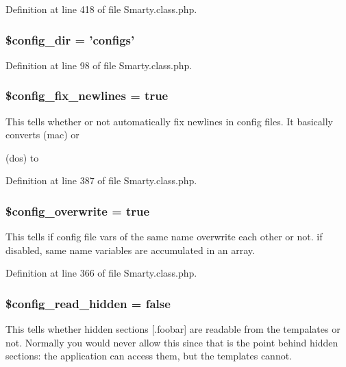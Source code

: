 \-Definition at line 418 of file \-Smarty.\-class.\-php.

\hypertarget{class_smarty_abb77b9d3df110ff462474ee0feaa7859}{
\subsubsection[{\$config\-\_\-dir}]{\setlength{\rightskip}{0pt plus 5cm}\$config\-\_\-dir = 'configs'}}\label{class_smarty_abb77b9d3df110ff462474ee0feaa7859}


\-Definition at line 98 of file \-Smarty.\-class.\-php.

\hypertarget{class_smarty_a4df07d516adb04c09b5f77b556d3b5bc}{
\subsubsection[{\$config\-\_\-fix\-\_\-newlines}]{\setlength{\rightskip}{0pt plus 5cm}\$config\-\_\-fix\-\_\-newlines = true}}\label{class_smarty_a4df07d516adb04c09b5f77b556d3b5bc}
\-This tells whether or not automatically fix newlines in config files. \-It basically converts  (mac) or \par
 (dos) to \par
 

\-Definition at line 387 of file \-Smarty.\-class.\-php.

\hypertarget{class_smarty_a728421c1493ea20b619459924184b06d}{
\subsubsection[{\$config\-\_\-overwrite}]{\setlength{\rightskip}{0pt plus 5cm}\$config\-\_\-overwrite = true}}\label{class_smarty_a728421c1493ea20b619459924184b06d}
\-This tells if config file vars of the same name overwrite each other or not. if disabled, same name variables are accumulated in an array. 

\-Definition at line 366 of file \-Smarty.\-class.\-php.

\hypertarget{class_smarty_add257cafa2cc7f2c68381f9bcc6f4d7b}{
\subsubsection[{\$config\-\_\-read\-\_\-hidden}]{\setlength{\rightskip}{0pt plus 5cm}\$config\-\_\-read\-\_\-hidden = false}}\label{class_smarty_add257cafa2cc7f2c68381f9bcc6f4d7b}
\-This tells whether hidden sections \mbox{[}.foobar\mbox{]} are readable from the tempalates or not. \-Normally you would never allow this since that is the point behind hidden sections\-: the application can access them, but the templates cannot. 

